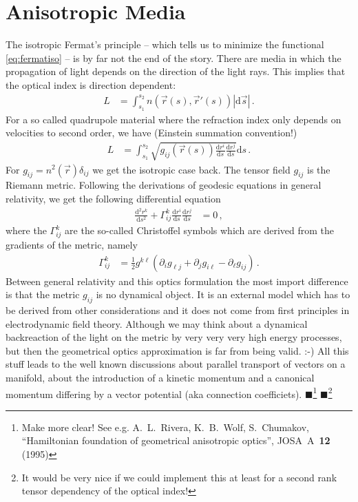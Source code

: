 \documentclass[12pt,a4paper,twoside,openright,BCOR10mm,headsepline,titlepage,abstracton,chapterprefix,final]{scrreprt}
\newcommand{\remark}[1]{{\color{red}$\blacksquare$}\footnote{{\color{red}#1}}}
\begin{document}
\section{Anisotropic Media}
The isotropic Fermat's principle -- which tells us to minimize the functional \eqref{eq:fermatiso} -- is by far not the end of the
story. There are media in which the propagation of light depends on the direction of the light rays. This implies that the
optical index is direction dependent:
\begin{align}
 L &= \int_{s_1}^{s_2} n(\vec{r}(s), \vec{r}'(s)) |\text{d}\vec{s}|\,.\label{eq:fermataniso}
\end{align}
For a so called quadrupole material where the refraction index only depends on velocities to second order,
we have (Einstein summation convention!)
\begin{align}
  L &= \int_{s_1}^{s_2} \sqrt{g_{ij}(\vec{r}(s)) \frac{\text{d}r^i}{\text{d}s} \frac{\text{d}r^j}{\text{d}s}} \text{d}s\,.\label{eq:fermataniso2}
\end{align}
For $g_{ij} = n^2(\vec{r}) \delta_{ij}$ we get the isotropic case back.
The tensor field $g_{ij}$ is the Riemann metric. Following the derivations of geodesic equations in general relativity,
we get the following differential equation
\begin{align}
 \frac{\text{d}^2 r^k}{\text{d}s^2} + \Gamma^k_{ij} \frac{\text{d}r^i}{\text{d}s} \frac{\text{d}r^j}{\text{d}s} &= 0\,,
\end{align}
where the $\Gamma^k_{ij}$ are the so-called Christoffel symbols which are derived from the gradients of the metric, namely
\begin{align}
 \Gamma^k_{ij} &= \frac{1}{2} g^{k\ell} \left(\partial_i g_{\ell j} + \partial_j g_{i \ell} - \partial_\ell g_{ij}\right)\,.
\end{align}
Between general relativity and this optics formulation the most import difference is that the metric $g_{ij}$ is no dynamical
object. It is an external model which has to be derived from other considerations and it does not come from first principles in
electrodynamic field theory. Although we may think about a dynamical backreaction of the light on the metric by very very very
high energy processes, but then the geometrical optics approximation is far from being valid. :-)
All this stuff leads to the well known discussions about parallel transport of vectors on a manifold, about the introduction of a
kinetic momentum and a canonical momentum differing by a vector potential (aka connection coefficiets).
\remark{Make more clear! See e.g. A.~L.~Rivera, K.~B.~Wolf, S.~Chumakov, ``Hamiltonian foundation of geometrical anisotropic optics'', JOSA~A~{\bf 12} (1995)}
\remark{It would be very nice if we could implement this at least for a second rank tensor dependency of the optical index!}
\end{document}
